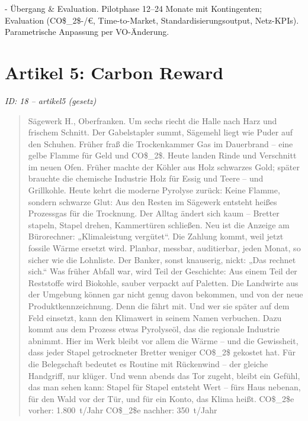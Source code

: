 \documentclass[12pt,a4paper]{scrartcl}
\begin{document}
- Übergang \& Evaluation. Pilotphase 12--24 Monate mit Kontingenten; Evaluation (CO\$\_2\$-/€, Time-to-Market, Standardisierungsoutput, Netz-KPIs). Parametrische Anpassung per VO-Änderung.


\section[Artikel 5: Carbon Reward]{Artikel 5: Carbon Reward}
\noindent\textit{ID: 18 -- artikel5 (gesetz)}

\begin{quote}
Sägewerk H., Oberfranken. Um sechs riecht die Halle nach Harz und frischem Schnitt. Der Gabelstapler summt, Sägemehl liegt wie Puder auf den Schuhen. Früher fraß die Trockenkammer Gas im Dauerbrand -- eine gelbe Flamme für Geld und CO\$\_2\$. Heute landen Rinde und Verschnitt im neuen Ofen. Früher machte der Köhler aus Holz schwarzes Gold; später brauchte die chemische Industrie Holz für Essig und Teere -- und Grillkohle. Heute kehrt die moderne Pyrolyse zurück: Keine Flamme, sondern schwarze Glut: Aus den Resten im Sägewerk entsteht heißes Prozessgas für die Trocknung. Der Alltag ändert sich kaum -- Bretter stapeln, Stapel drehen, Kammertüren schließen. Neu ist die Anzeige am Bürorechner: „Klimaleistung vergütet“. Die Zahlung kommt, weil jetzt fossile Wärme ersetzt wird. Planbar, messbar, auditierbar, jeden Monat, so sicher wie die Lohnliste. Der Banker, sonst knauserig, nickt: „Das rechnet sich.“ Was früher Abfall war, wird Teil der Geschichte: Aus einem Teil der Reststoffe wird Biokohle, sauber verpackt auf Paletten. Die Landwirte aus der Umgebung können gar nicht genug davon bekommen, und von der neue Produktkennzeichnung. Denn die fährt mit. Und wer sie später auf dem Feld einsetzt, kann den Klimawert in seinem Namen verbuchen. Dazu kommt aus dem Prozess etwas Pyrolyseöl, das die regionale Industrie abnimmt. Hier im Werk bleibt vor allem die Wärme -- und die Gewissheit, dass jeder Stapel getrockneter Bretter weniger CO\$\_2\$ gekostet hat. Für die Belegschaft bedeutet es Routine mit Rückenwind -- der gleiche Handgriff, nur klüger. Und wenn abends das Tor zugeht, bleibt ein Gefühl, das man sehen kann: Stapel für Stapel entsteht Wert -- fürs Haus nebenan, für den Wald vor der Tür, und für ein Konto, das Klima heißt. CO\$\_2\$e vorher: 1.800 t/Jahr CO\$\_2\$e nachher: 350 t/Jahr


\end{quote}
\end{document}
